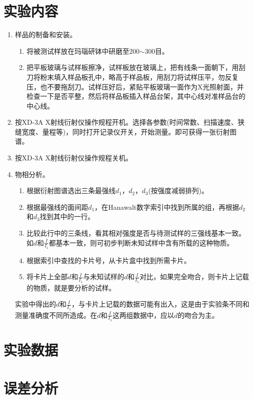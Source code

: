 \documentclass[a4paper]{article}
\begin{document}
\section{实验内容}
\begin{enumerate}
\item 样品的制备和安装。
\begin{enumerate}
\item 将被测试样放在玛瑙研钵中研磨至200$\sim$300目。
\item 把平板玻璃与试样板擦净，试样板放在玻璃上，把有线条一面朝下，用刮刀将粉末填入样品板孔中，略高于样品板，用刮刀将试样压平，勿反复压，也不要拖刮刀。试样压好后，紧贴平板玻璃一面作为X光照射面，并检查一下是否平整，然后将样品板插入样品台架，其中心线对准样品台的中心线。
\end{enumerate}
\item 按XD-3A X射线衍射仪操作规程开机。选择各参数(时间常数、扫描速度、狭缝宽度、量程等)，同时打开记录仪开关，开始测量。即可获得一张衍射图谱。
\item 按XD-3A X射线衍射仪操作规程关机。
\item 物相分析。
\begin{enumerate}
\item 根据衍射图谱选出三条最强线$d_1$，$d_2$，$d_3$(按强度减弱排列)。
\item 根据最强线的面间距$d_1$，在Hanawalt数字索引中找到所属的组，再根据$d_2$和$d_3$找到其中的一行。
\item 比较此行中的三条线，看其相对强度是否与待测试样的三强线基本一致。如$d$和$\frac{I}{I_1}$都基本一致，则可初步判断未知试样中含有所载的这种物质。
\item 根据索引中查找的卡片号，从卡片盒中找到所需卡片。
\item 将卡片上全部$d$和$\frac{I}{I_1}$与未知试样的$d$和$\frac{I}{I_1}$对比，如果完全吻合，则卡片上记载的物质，就是要分析的试样。
\end{enumerate}
实验中得出的$d$和$\frac{I}{I_1}$，与卡片上记载的数据可能有出入，这是由于实验条不同和测量准确度不同所造成。在$d$和$\frac{I}{I_1}$这两组数据中，应以$d$的吻合为主。
\end{enumerate}

\section{实验数据}

\section{误差分析}
\end{document}
